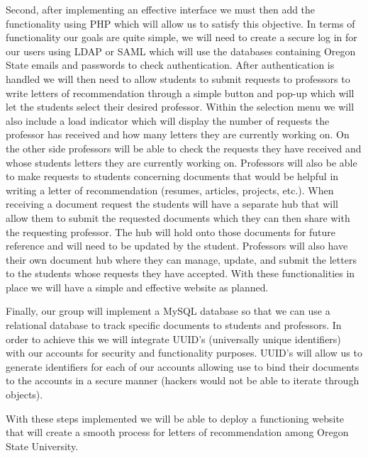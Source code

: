 \documentclass[onecolumn, draftclsnofoot,10pt, compsoc]{IEEEtran}
\begin{document}
Second, after implementing an effective interface we must then add the functionality using PHP which will allow us to satisfy this objective. In terms of functionality our goals are quite simple, we will need to create a secure log in for our users using LDAP or SAML which will use the databases containing Oregon State emails and passwords to check authentication. After authentication is handled we will then need to allow students to submit requests to professors to write letters of recommendation through a simple button and pop-up which will let the students select their desired professor. Within the selection menu we will also include a load indicator which will display the number of requests the professor has received and how many letters they are currently working on. On the other side professors will be able to check the requests they have received and whose students letters they are currently working on. Professors will also be able to make requests to students concerning documents that would be helpful in writing a letter of recommendation (resumes, articles, projects, etc.). When receiving a document request the students will have a separate hub that will allow them to submit the requested documents which they can then share with the requesting professor. The hub will hold onto those documents for future reference and will need to be updated by the student. Professors will also have their own document hub where they can manage, update, and submit the letters to the students whose requests they have accepted. With these functionalities in place we will have a simple and effective website as planned.\vspace{4mm}
 
Finally, our group will implement a MySQL database so that we can use a relational database to track specific documents to students and professors. In order to achieve this we will integrate UUID’s (universally unique identifiers) with our accounts for security and functionality purposes. UUID’s will allow us to generate identifiers for each of our accounts allowing use to bind their documents to the accounts in a secure manner (hackers would not be able to iterate through objects). \vspace{4mm}

With these steps implemented we will be able to deploy a functioning website that will create a smooth process for letters of recommendation among Oregon State University. 

\center
\end{document}
